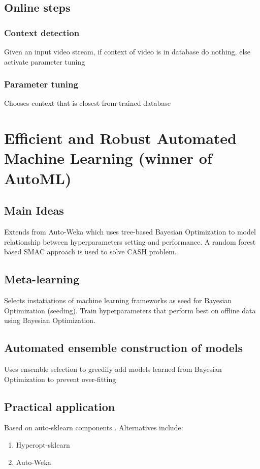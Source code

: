 \subsection{Online
steps}

\subsubsection{Context
detection}

Given
an
input
video
stream,
if
context
of
video
is
in
database
do
nothing,
else
activate
parameter
tuning

\subsubsection{Parameter
tuning}

Chooses
context
that
is
closest
from
trained
database

\section{Efficient
and
Robust
Automated
Machine
Learning
(winner
of
AutoML)
\cite{feurer2015efficient}}

\subsection{Main
Ideas}
Extends
from
Auto-Weka
which
uses
tree-based
Bayesian
Optimization
\cite{thornton2013auto}
to
model
relationship
between
hyperparameters
setting
and
performance.
A
random
forest
based
SMAC
approach
is
used
to
solve
CASH
problem.

\subsection{Meta-learning}
Selects
instatiations
of
machine
learning
frameworks
as
seed
for
Bayesian
Optimization
(seeding).
Train
hyperparameters
that
perform
best
on
offline
data
using
Bayesian
Optimization.

\subsection{Automated
ensemble
construction
of
models}
Uses
ensemble
selection
\cite{caruana2004ensemble}
to
greedily
add
models
learned
from
Bayesian
Optimization
to
prevent
over-fitting 

\subsection{Practical
application}
Based
on
auto-sklearn
components
\cite{NIPS2015_5872}.
Alternatives
include:
\begin{enumerate}
  \item
    Hyperopt-sklearn
    \cite{komer2014hyperopt}
  \item
    Auto-Weka
    \cite{thornton2013auto}
\end{enumerate}

